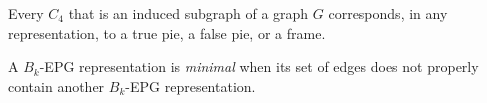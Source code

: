 \documentclass[runningheads]{llncs}
\begin{document}
%


\begin{lemma}\label{lem:representacaoC4}
\cite{golumbic2009} Every  $C_4$ that is an induced subgraph of a graph $ G $ corresponds, in any representation, to a true pie, a false pie, or a frame.
\end{lemma}




\begin{definition}
A $B_k$-EPG representation is \emph{minimal} 
when its set of edges  does not properly contain another $B_k$-EPG representation. 
\end{definition}
\end{document}
